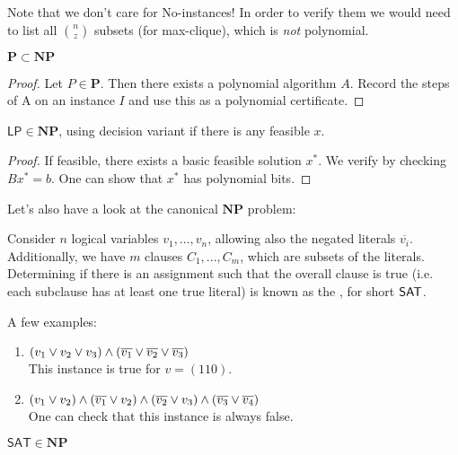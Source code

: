 \begin{remark}
    Note that we don't care for No-instances! In order to verify them we would need to
    list all $\binom{n}{z}$ subsets (for max-clique), which is \emph{not} polynomial.
\end{remark}
\begin{theorem}
    $\mathbf{P} \subset \mathbf{NP}$
\end{theorem}
\begin{proof}
    Let $P\in \mathbf{P}$. Then there exists a polynomial algorithm $A$.
    Record the steps of A on an instance $I$ and use this as a polynomial certificate.
\end{proof}
\begin{theorem}\label{thm:LP-NP}
    $\mathsf{LP} \in \mathbf{NP}$, using decision variant if there is any feasible $x$.
\end{theorem}
\begin{proof}
    If feasible, there exists a basic feasible solution $x^*$.
    We verify by checking $Bx^*=b$. One can show that $x^*$ has polynomial bits.
\end{proof}
Let's also have a look at the canonical $\mathbf{NP}$ problem:
\begin{definition}
    Consider $n$ logical variables $v_1,...,v_n$,
    allowing also the negated literals $\overline{v_i}$.
    Additionally, we have $m$ clauses $C_1,...,C_m$, which are subsets of the literals.
    Determining if there is an assignment such that the overall clause is true (i.e. each subclause has at least one true literal)
    is known as the , for short $\mathsf{SAT}$.
\end{definition}
\begin{example} A few examples: \label{ex:SAT_formulas}
    \begin{enumerate}
        \item $(v_1 \vee v_2 \vee v_3) \wedge (\overline{v_1} \vee \overline{v_2} \vee \overline{v_3})$\\
              This instance is true for $v=(110)$.
        \item $(v_1 \vee v_2) \wedge (\overline{v_1} \vee v_2) \wedge (\overline{v_2} \vee v_3) \wedge (\overline{v_3} \vee \overline{v_4})$\\
              One can check that this instance is always false.
    \end{enumerate}
\end{example}
\begin{theorem}
    $\mathsf{SAT} \in \mathbf{NP}$
\end{theorem}
